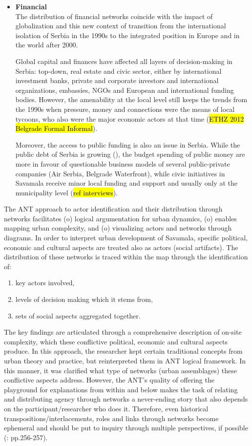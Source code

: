 \documentclass[11pt]{report}
\begin{document}
\begin{itemize}
\item \textbf{Financial}
\\
The distribution of financial networks coincide with the impact of globalization and this new context of transition from the international isolation of Serbia in the 1990s to the integrated position in Europe and in the world after 2000.

Global capital and finances have affected all layers of decision-making in Serbia: top-down, real estate and civic sector, either by international investment banks, private and corporate investors and international organizations, embassies, NGOs and European and international funding bodies.
However, the amenability at the local level still keeps the trends from the 1990s when pressure, money and connections were the means of local tycoons, who also were the major economic actors at that time (\hl{ETHZ 2012 Belgrade Formal Informal}).

Moreover, the access to public funding is also an issue in Serbia.
While the public debt of Serbia is growing (\cite{Table RS}), the budget spending of public money are more in favour of questionable business models of several public-private companies (Air Serbia, Belgrade Waterfront), while civic initiatives in Savamala receive minor local funding and support and usually only at the municipality level (\hl{ref interviews}).
\end{itemize}

The ANT approach to actor identification and their distribution through networks facilitates
(o) logical argumentation for urban dynamics,
(o) enables mapping urban complexity, and
(o) visualizing actors and networks through diagrams.
In order to interpret urban development of Savamala, specific political, economic and cultural aspects are treated also as actors (social artifacts).
The distribution of these networks is traced within the map through the identification of:

\begin{enumerate}
\item key actors involved,
\item levels of decision making which it stems from,
\item sets of social aspects aggregated together.
\end{enumerate}

The key findings are articulated through a comprehensive description of on-site complexity, which these conflictive political, economic and cultural aspects produce.
In this approach, the researcher kept certain traditional concepts from urban theory and practice, but reinterpreted them in ANT logical framework.
In this manner, it was clarified what type of networks (urban assemblages) these conflictive aspects address.
However, the ANT's quality of offering the playground for explanations from within and below makes the task of relating and distributing agency through networks a never-ending story that also depends on the participant/researcher who does it. Therefore, even historical transpositions/interlacements, roles and links through networks become ephemeral and should be put to inquiry through multiple perspectives, if possible (\cite{Latour 2005}: pp.256-257).
\end{document}
